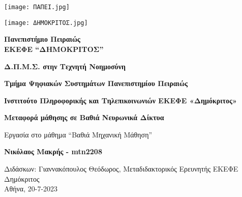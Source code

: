 \thispagestyle{empty} %

\begin{minipage}[c]{0.32\textwidth}
	\begin{minipage}[c]{0.48\textwidth}
		\texttt{[image: ΠΑΠΕΙ.jpg]}
	\end{minipage}
	\begin{minipage}[c]{0.48\textwidth}
			\texttt{[image: ΔΗΜΟΚΡΙΤΟΣ.jpg]}
	\end{minipage}
\end{minipage}
\begin{minipage}[c]{0.68\textwidth}
	\begin{Large}
		\textbf{Πανεπιστήμιο Πειραιώς} \\
		\textbf{ΕΚΕΦΕ “ΔΗΜΟΚΡΙΤΟΣ”} \\
	\end{Large}
	\begin{large}
		\textbf{Δ.Π.Μ.Σ. στην Τεχνητή Νοημοσύνη} \\
	\end{large}
	\begin{large}
		\textbf{Τμήμα Ψηφιακών Συστημάτων Πανεπιστημίου Πειραιώς} \\
	\end{large}
	\begin{large}
		\textbf{Ινστιτούτο Πληροφορικής και Τηλεπικοινωνιών ΕΚΕΦΕ «Δημόκριτος»} \\
	\end{large}
\end{minipage}
\begin{center}
	\begin{Large}
		\vspace{0.1\textheight}
		\textbf{Μεταφορά μάθησης σε Βαθιά Νευρωνικά Δίκτυα}\\
	\end{Large}	
	\vspace{0.15\textheight} 
	Εργασία στο μάθημα “Βαθιά Μηχανική Μάθηση”\\	
	\begin{Large}
		\vspace{0.05\textheight}
		\textbf{Νικόλαος Μακρής - mtn2208}\\
	\end{Large}
	\vspace{0.25\textheight} 
	Διδάσκων: Γιαννακόπουλος Θεόδωρος, Μεταδιδακτορικός Ερευνητής ΕΚΕΦΕ Δημόκριτος\\
	\vspace{\fill}
	Αθήνα, 20-7-2023
\end{center}
 



